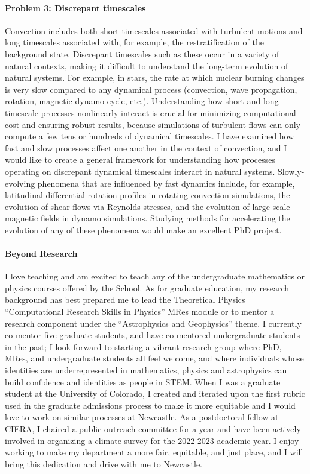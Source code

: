 \documentclass[12pt]{article}
\begin{document}
\paragraph*{Problem 3: Discrepant timescales}
Convection includes both short timescales associated with turbulent motions and long timescales associated with, for example, the restratification of the background state.
Discrepant timescales such as these occur in a variety of natural contexts, making it difficult to understand the long-term evolution of natural systems.
For example, in stars, the rate at which nuclear burning changes is very slow compared to any dynamical process (convection, wave propagation, rotation, magnetic dynamo cycle, etc.).
Understanding how short and long timescale processes nonlinearly interact is crucial for minimizing computational cost and ensuring robust results, because simulations of turbulent flows can only compute a few tens or hundreds of dynamical timescales.
I have examined how fast and slow processes affect one another in the context of convection, and I would like to create a general framework for understanding how processes operating on discrepant dynamical timescales interact in natural systems.
Slowly-evolving phenomena that are influenced by fast dynamics include, for example, latitudinal differential rotation profiles in rotating convection simulations, the evolution of shear flows via Reynolds stresses, and the evolution of large-scale magnetic fields in dynamo simulations.
Studying methods for accelerating the evolution of any of these phenomena would make an excellent PhD project.


\paragraph*{Beyond Research}
I love teaching and am excited to teach any of the undergraduate mathematics or physics courses offered by the School. 
As for graduate education, my research background has best prepared me to lead the Theoretical Physics ``Computational Research Skills in Physics'' MRes module or to mentor a research component under the ``Astrophysics and Geophysics'' theme.
I currently co-mentor five graduate students, and have co-mentored undergraduate students in the past; I look forward to starting a vibrant research group where PhD, MRes, and undergraduate students all feel welcome, and where individuals whose identities are underrepresented in mathematics, physics and astrophysics can build confidence and identities as people in STEM.
When I was a graduate student at the University of Colorado, I created and iterated upon the first rubric used in the graduate admissions process to make it more equitable and I would love to work on similar processes at Newcastle.
As a postdoctoral fellow at CIERA, I chaired a public outreach committee for a year and have been actively involved in organizing a climate survey for the 2022-2023 academic year.
I enjoy working to make my department a more fair, equitable, and just place, and I will bring this dedication and drive with me to Newcastle.

{\scriptsize

}
\end{document}
